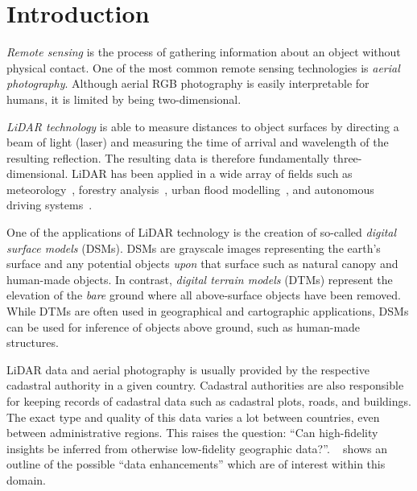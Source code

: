 \section*{Introduction}
\setcounter{page}{1}  %

\textit{Remote sensing} is the process of gathering information about an object without physical contact.
One of the most common remote sensing technologies is \textit{aerial photography}.
Although aerial RGB photography is easily interpretable for humans, it is limited by being two-dimensional.

\textit{LiDAR technology} is able to measure distances to object surfaces by directing a beam of light (laser) and measuring the time of arrival and wavelength of the resulting reflection.
The resulting data is therefore fundamentally three-dimensional.
LiDAR has been applied in a wide array of fields such as meteorology~\cite{lidar_meteorology_1966}, forestry analysis~\cite{lidar_forestry_2000}, urban flood modelling~\cite{lidar_flood_2013}, and autonomous driving systems~\cite{lidar_self_driving_2018}.

One of the applications of LiDAR technology is the creation of so-called \textit{digital surface models} (DSMs).
DSMs are grayscale images representing the earth's surface and any potential objects \textit{upon} that surface such as natural canopy and human-made objects.
In contrast, \textit{digital terrain models} (DTMs) represent the elevation of the \textit{bare} ground where all above-surface objects have been removed.
While DTMs are often used in geographical and cartographic applications, DSMs can be used for inference of objects above ground, such as human-made structures.

LiDAR data and aerial photography is usually provided by the respective cadastral authority in a given country.
Cadastral authorities are also responsible for keeping records of cadastral data such as cadastral plots, roads, and buildings.
The exact type and quality of this data varies a lot between countries, even between administrative regions.
This raises the question: \enquote{Can high-fidelity insights be inferred from otherwise low-fidelity geographic data?}.
~ shows an outline of the possible \enquote{data enhancements} which are of interest within this domain.

